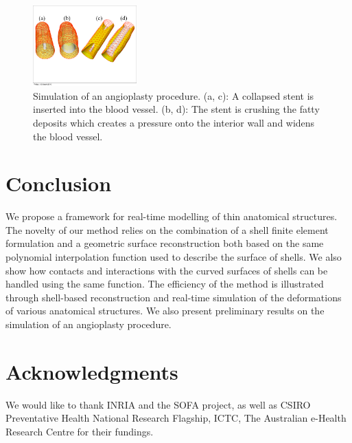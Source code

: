 \documentclass{llncs}
\begin{document}
\begin{figure}
\centering
\includegraphics[height=3.1cm]{images/stenose_final.pdf}
\caption {Simulation of an angioplasty procedure. (a, c): A collapsed stent is inserted into the blood vessel. (b, d): The stent is crushing the fatty deposits which creates a pressure onto the interior wall and widens the blood vessel.}
\label{fig-stent}
\end{figure}

\section{Conclusion}
We propose a framework for real-time modelling of thin anatomical structures. The novelty of our method relies on the combination of a shell finite element formulation and a geometric surface reconstruction both based on the same polynomial interpolation function used to describe the surface of shells. We also show how contacts and interactions with the curved surfaces of shells can be handled using the same function. The efficiency of the method is illustrated through shell-based reconstruction and real-time simulation of the deformations of various anatomical structures. We also present preliminary results on the simulation of an angioplasty procedure. 

\section*{Acknowledgments}
We would like to thank INRIA and the SOFA project, as well as CSIRO Preventative Health National Research Flagship, ICTC, The Australian e-Health Research Centre for their fundings.



\end{document}
